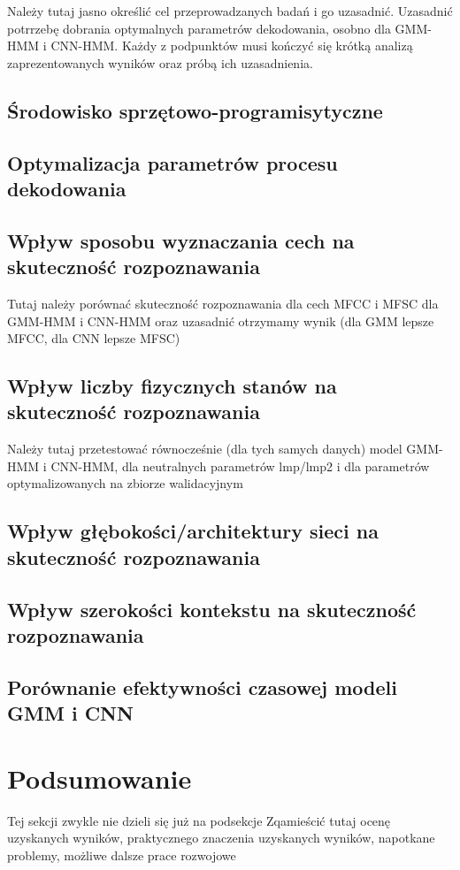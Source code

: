 \documentclass[11pt]{article}
\begin{document}
    Należy tutaj jasno określić cel przeprowadzanych badań i go uzasadnić. Uzasadnić potrrzebę dobrania optymalnych parametrów dekodowania, osobno dla GMM-HMM i CNN-HMM. Każdy z podpunktów musi kończyć się krótką analizą zaprezentowanych wyników oraz próbą ich uzasadnienia.
	\subsection{ Środowisko sprzętowo-programisytyczne }
	\subsection{ Optymalizacja parametrów procesu dekodowania }
	\subsection{ Wpływ sposobu wyznaczania cech na skuteczność rozpoznawania }
	Tutaj należy porównać skuteczność rozpoznawania dla cech MFCC i MFSC dla GMM-HMM i CNN-HMM oraz uzasadnić otrzymamy wynik (dla GMM lepsze MFCC, dla CNN lepsze MFSC)
	\subsection{Wpływ liczby fizycznych stanów na skuteczność rozpoznawania }
	Należy tutaj przetestować równocześnie (dla tych samych danych) model GMM-HMM i CNN-HMM, dla neutralnych parametrów lmp/lmp2 i dla parametrów optymalizowanych na zbiorze walidacyjnym
	\subsection{ Wpływ głębokości/architektury sieci na skuteczność rozpoznawania }
	\subsection{ Wpływ szerokości kontekstu na skuteczność rozpoznawania }
	\subsection{ Porównanie efektywności czasowej modeli GMM i CNN }

\section{ Podsumowanie }
  Tej sekcji zwykle nie dzieli się już na podsekcje Zqamieścić tutaj ocenę uzyskanych wyników, praktycznego znaczenia uzyskanych wyników, napotkane problemy, możliwe dalsze prace rozwojowe
   
   
	\nocite{*}
	
	
\end{document}
